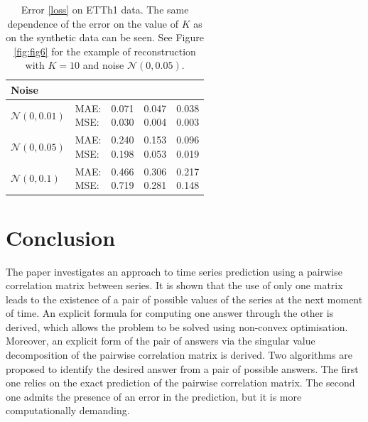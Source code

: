 \documentclass[12pt]{article}
\begin{document}
{\begin{table}[!h]
\def\arraystretch{2.3}
\begin{center}
\caption{Error \eqref{loss} on ETTh1 data. The same dependence of the error on the value of $K$ as on the synthetic data can be seen. See Figure \ref{fig:fig6} for the example of reconstruction with $K=10$ and noise $\mathcal{N}(0, 0.05)$.}
\begin{tabular}{|l||l||*{3}{c|}}\hline
	{Noise}
	&\makebox[3em]{Metric}&\makebox[3em]{$K=2$}&\makebox[3em]{$K=4$}&\makebox[3em]{$K=10$}\\\hline
	$\mathcal{N}(0, 0.01)$&\makecell{ MAE: \\ MSE: } &\makecell{ 0.071 \\ 0.030 }&\makecell{ 0.047 \\ 0.004 }&\makecell{ 0.038 \\ 0.003 }\\\hline
	$\mathcal{N}(0, 0.05)$&\makecell{ MAE: \\ MSE: } &\makecell{ 0.240 \\ 0.198 }&\makecell{ 0.153 \\ 0.053 }&\makecell{ 0.096 \\ 0.019 }\\\hline
	$\mathcal{N}(0, 0.1)$& \makecell{ MAE: \\ MSE: } &\makecell{ 0.466 \\ 0.719 }&\makecell{ 0.306 \\ 0.281 }&\makecell{ 0.217 \\ 0.148 }\\\hline
\end{tabular}
\end{center}
\end{table}

\section{Conclusion}
The paper investigates an approach to time series prediction using a pairwise correlation matrix between series. It is shown that the use of only one matrix leads to the existence of a pair of possible values of the series at the next moment of time. An explicit formula for computing one answer through the other is derived, which allows the problem to be solved using non-convex optimisation. Moreover, an explicit form of the pair of answers via the singular value decomposition of the pairwise correlation matrix is derived. Two algorithms are proposed to identify the desired answer from a pair of possible answers. The first one relies on the exact prediction of the pairwise correlation matrix. The second one admits the presence of an error in the prediction, but it is more computationally demanding.

}
\end{document}
